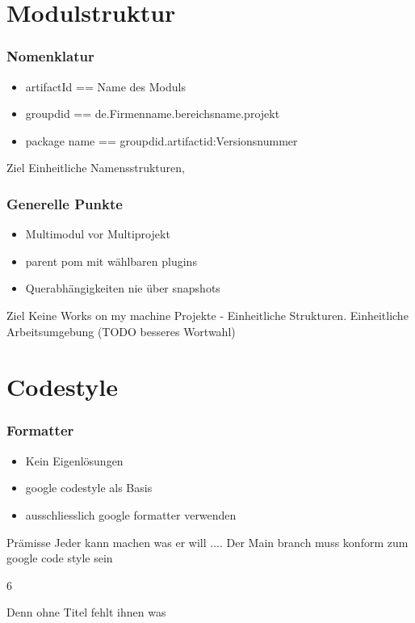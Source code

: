 \documentclass[hyperref={pdfpagelabels=false}]{beamer}
\begin{document}
\section{Modulstruktur}
\begin{frame}
  \frametitle{Nomenklatur}
  \begin{itemize}
  \item artifactId == Name des Moduls
  \item groupdid == de.Firmenname.bereichsname.projekt
    \item package name == groupdid.artifactid:Versionsnummer
  \end{itemize}
  \begin{block}{Ziel}
    Einheitliche Namensstrukturen, 
    \end{block}
\end{frame}
\begin{frame}
  \frametitle{Generelle Punkte}
  \begin{itemize}
  \item Multimodul vor Multiprojekt
  \item parent pom mit wählbaren plugins
  \item Querabhängigkeiten nie über snapshots
  \end{itemize}
  \begin{block}{Ziel}
    Keine Works on my machine Projekte - Einheitliche Strukturen. Einheitliche Arbeitsumgebung (TODO besseres Wortwahl)
    \end{block}
\end{frame}
\section{Codestyle}
\begin{frame}
  \frametitle{Formatter}
  \begin{itemize}
  \item Kein Eigenlösungen
  \item google codestyle als Basis
  \item ausschliesslich google formatter verwenden
  \end{itemize}
  \begin{block}{Prämisse}
    Jeder kann machen was er will .... Der Main branch muss konform zum google code style sein
    \end{block}
\end{frame}
6


\begin{frame} 
Denn ohne Titel fehlt ihnen was
\end{frame}
\end{document}
